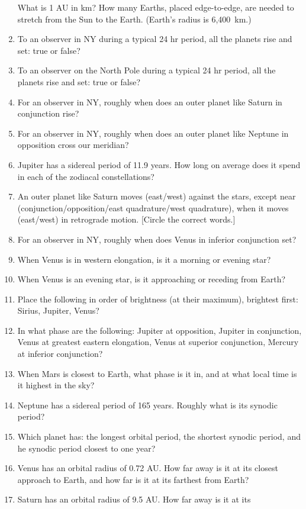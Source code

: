 \documentclass{article}
\begin{document}
\begin{enumerate}
What is 1 AU in km?  How many Earths, placed edge-to-edge, are needed
to stretch from the Sun to the Earth.  (Earth's radius is 6,400~km.)
\item 
To an observer in NY during a typical 24 hr period, all the planets
rise and set: true or false?
\item 
To an observer on the North Pole during a typical 24 hr period, all the
planets rise and set: true or false?
\item 
For an observer in NY, roughly when does an outer planet like Saturn in
conjunction rise?
\item 
For an observer in NY, roughly when does an outer planet like Neptune in
opposition cross our meridian?
\item
Jupiter has a sidereal period of 11.9 years. How long on average does
it spend in each of the zodiacal constellations?
\item
An outer planet like Saturn moves (east/west) against the stars,
except near (conjunction/opposition/east quadrature/west quadrature),
when it moves (east/west) in retrograde motion.  [Circle the correct
words.]
\item
For an observer in NY, roughly when does Venus in inferior conjunction
set?
\item
When Venus is in western elongation, is it a morning or evening star?
\item
When Venus is an evening star, is it approaching or receding from
Earth?
\item
Place the following in order of brightness (at their maximum),
brightest first: Sirius, Jupiter, Venus?
\item
In what phase are the following: Jupiter at opposition, Jupiter in
conjunction, Venus at greatest eastern elongation, Venus at superior
conjunction, Mercury at inferior conjunction?
\item
When Mars is closest to Earth, what phase is it in, and at what local
time is it highest in the sky?
\item
Neptune has a sidereal period of 165 years.  Roughly what is its
synodic period?
\item
Which planet has: the longest orbital period, the shortest synodic
period, and he synodic period closest to one year?
\item
Venus has an orbital radius of 0.72 AU. How far away is it at its
closest approach to Earth, and how far is it at its farthest from
Earth?
\item
Saturn has an orbital radius of 9.5 AU. How far away is it at its

\end{enumerate}
\end{document}
